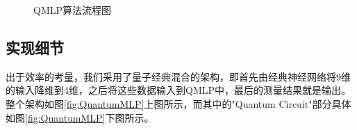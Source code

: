 \documentclass[10pt,a4paper,twoside]{article}
\numberwithin{figure}{section}%
\numberwithin{table}{section}%
\begin{document}
\begin{figure}[tb]
    \centering
    \caption{QMLP算法流程图}
    \label{fig:qmlp_flow_smart}
\end{figure}

\subsection{实现细节}

出于效率的考量，我们采用了量子经典混合的架构，即首先由经典神经网络将9维的输入降维到4维，之后将这些数据输入到QMLP中，最后的测量结果就是输出。整个架构如图\ref{fig:QuantumMLP}上图所示，而其中的"Quantum Circuit"部分具体如图\ref{fig:QuantumMLP}下图所示。
\end{document}
